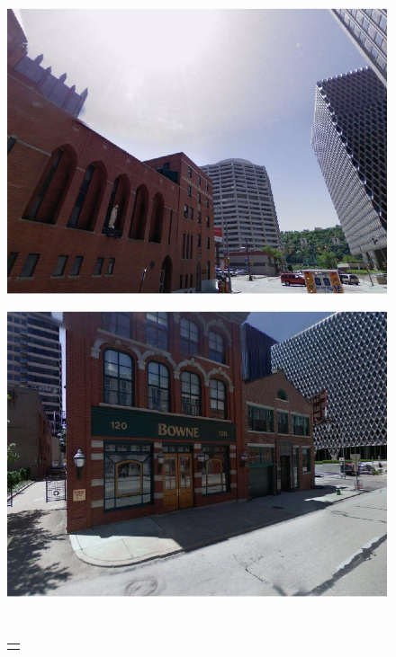 \begin{figure}[!ht]
{\begin{minipage}{\subw}
{		  \includegraphics[width=1.05\linewidth]{imgs/demo03c.jpg}
		  }
		\end{minipage}
	 }
	 \colorbox{myRed}{
		\begin{minipage}{\subw}
		  \centerline{
		  \includegraphics[width=1.05\linewidth]{imgs/demo04c.jpg}
		  }
		\end{minipage}
	 }
	 \\
	 \begin{minipage}{0.93\linewidth}
		\centering
		\begin{tabular}{c}
		  \vspace{-3mm}
		  \hspace{\linewidth} \\

\end{tabular}
\end{minipage}
\end{figure}
